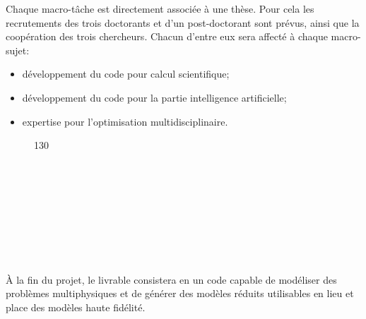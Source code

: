 \documentclass[12pt, french]{article}
\begin{document}
Chaque macro-tâche est directement associ\'ee \`a une thèse. Pour cela les recrutements des trois doctorants et d'un post-doctorant sont prévus, ainsi que la coopération des trois chercheurs. Chacun d'entre eux sera affecté \`a chaque macro-sujet:
\begin{itemize}
\item développement du code pour calcul scientifique;
\item développement du code pour la partie intelligence artificielle;
\item expertise pour l'optimisation multidisciplinaire.
\end{itemize} 
\begin{figure}[h!]
	\begin{center}
	\begin{ganttchart}[y unit title=0.6cm,
		y unit chart=0.6cm, 
		x unit=0.4cm,
		vgrid,hgrid, 
		title label anchor/.style={below=-1.6ex},
		title left shift=.05,
		title right shift=-.05,
		title height=1,
		progress label text={},
		bar height=0.7,
		group right shift=0,
		group top shift=.6,
		group height=.4]{1}{30}
		 \\
		 \\
		 \\
		 \\
		 \\
		 \\
		 \\
		 \\
		 \\
	\end{ganttchart}
	\end{center}		
\end{figure}

\`A la fin du projet, le livrable consistera en un code capable de modéliser des problèmes multiphysiques et de générer des modèles réduits utilisables en lieu et place des modèles haute fidélité.
\end{document}
